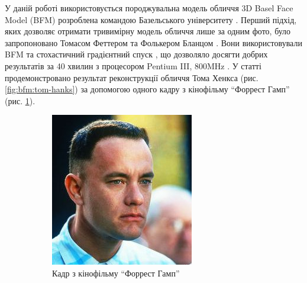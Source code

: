 У даній роботі використовується породжувальна модель обличчя
3D Basel Face Model (BFM)
розроблена командою Базельського університету
\cite{bfm09}.
Перший підхід,
яких дозволяє отримати тривимірну модель обличчя лише за одним фото,
було запропоновано Томасом Феттером та Фолькером Бланцом
\cite{blanz:vetter:1999}.
Вони використовували BFM та стохастичний градієнтний спуск \cite{sgd:1998},
що дозволяло досягти добрих результатів за 40 хвилин з процесором
Pentium III, 800MHz \cite{blanz:romdhani:vetter}.
У статті продемонстровано результат реконструкції
обличчя Тома Хенкса (рис. \ref{fig:bfm:tom-hanks})
за допомогою одного кадру з кінофільму ``Форрест Гамп''
(рис. \ref{fig:bfm:forrest-gump}).
\begin{figure}[h]
  \centering
  \begin{subfigure}[b]{0.4\textwidth}
    \centering
    \includegraphics[width=\textwidth]{images/forrest-gump}
    \caption{Кадр з кінофільму ``Форрест Гамп''}
    \label{fig:bfm:forrest-gump}
  \end{subfigure}
  \begin{subfigure}[b]{0.4\textwidth}
    \centering

\end{subfigure}
\end{figure}
